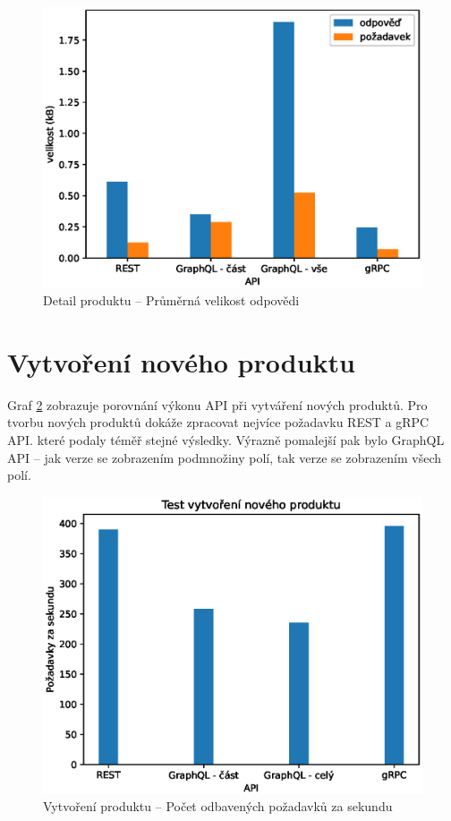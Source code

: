\documentclass[thesis=M,czech]{FITthesis}[2019/12/23]
\begin{document}
\begin{figure}[]
  \includegraphics[width=\linewidth]{img/req-size.eps}
  \caption{Detail produktu -- Průměrná velikost odpovědi}
\label{test_get_product_size}
\end{figure}

\clearpage
\section{Vytvoření nového produktu}
Graf \ref{test_create_product} zobrazuje porovnání výkonu API při vytváření nových produktů. Pro tvorbu nových produktů dokáže zpracovat nejvíce požadavku REST a gRPC API. které podaly téměř stejné výsledky. Výrazně pomalejší pak bylo GraphQL API -- jak verze se zobrazením podmnožiny polí, tak verze se zobrazením všech polí.

\begin{figure}[]
  \includegraphics[width=\linewidth]{img/create-product.eps}
  \caption{Vytvoření produktu -- Počet odbavených požadavků za sekundu}
\label{test_create_product}
\end{figure}
\end{document}
